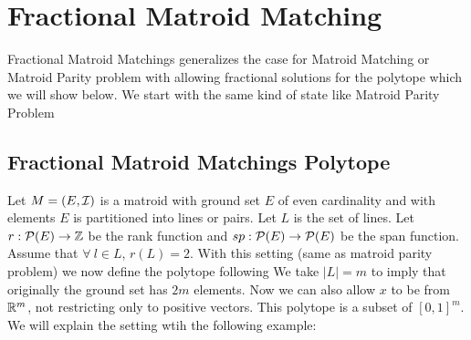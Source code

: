 \chapter{Fractional Matroid Matching}
Fractional Matroid Matchings generalizes the case for Matroid Matching or Matroid Parity problem with allowing fractional solutions for the polytope which we will show below. We start with the same kind of state like Matroid Parity Problem
\section{Fractional Matroid Matchings Polytope}
Let $M=(E,\mathcal{I})$ is a matroid  with ground set $E$ of even cardinality and with elements $E$ is partitioned  into lines or pairs. Let $L$ is the  set of lines.  Let $r:\mathcal{P}(E)\to \mathbb{Z}$ be the rank function and $sp:\mathcal{P}(E)\to \mathcal{P}(E)$ be the span function. Assume that $\forall\ l\in L$, $r(L)=2$. With this setting (same as matroid parity problem) we now define the polytope following \cite{VandeVate_1992_Fmm}
We take $|L|=m$ to imply that originally the ground set has $2m$ elements. Now we can also allow $x$ to be from $\mathbb{R}^{m}$, not restricting only to positive vectors. This polytope is a subset of $[0,1]^m$. We will explain the setting wtih the following example:
